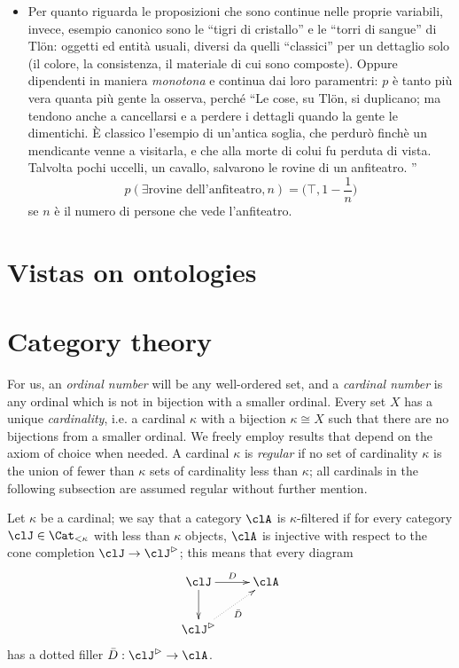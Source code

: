 \documentclass{amsart}
\begin{document}
\begin{itemize}
  \item Per quanto riguarda le proposizioni che sono continue nelle proprie variabili, invece, esempio canonico sono le ``tigri di cristallo'' e le ``torri di sangue'' di Tl\"{o}n: oggetti ed entità usuali, diversi da quelli ``classici'' per un dettaglio solo (il colore, la consistenza, il materiale di cui sono composte). Oppure dipendenti in maniera \emph{monotona} e continua dai loro paramentri: $p$ è tanto più vera quanta più gente la osserva, perché ``Le cose, su Tlön, si duplicano; ma tendono anche a cancellarsi e a  perdere i dettagli quando la gente le dimentichi. È classico l'esempio di  un'antica soglia, che perdurò finchè un mendicante venne a visitarla, e che alla  morte di colui fu perduta di vista. Talvolta pochi uccelli, un cavallo, salvarono le  rovine di un anfiteatro. ''
        \[\textstyle p(\exists\text{rovine dell'anfiteatro}, n) = \big(\top, 1-\frac{1}{n}\big)\]
        se $n$ è il numero di persone che vede l'anfiteatro.
\end{itemize}
\section{Vistas on ontologies}
\appendix
\section{Category theory}
For us, an \emph{ordinal number} will be any well\hyp{}ordered set, and a \emph{cardinal number} is any ordinal which is not in bijection with a smaller ordinal. Every set $X$ has a unique \emph{cardinality}, i.e. a cardinal $\kappa$ with a bijection $\kappa \cong X$ such that there are no bijections from a smaller ordinal. We freely employ results that depend on the axiom of choice when needed. A cardinal $\kappa$ is \emph{regular} if no set of cardinality $\kappa$ is the union of fewer than $\kappa$ sets of cardinality less than $\kappa$; all cardinals in the following subsection are assumed regular without further mention.

Let $\kappa$ be a cardinal; we say that a category $\clA$ is $\kappa$\hyp{}filtered if for every category $\clJ\in\Cat_{<\kappa}$ with less than $\kappa$ objects, $\clA$ is injective with respect to the cone completion $\clJ\to \clJ^\rhd$; this means that every diagram
\[
  \vcenter{\xymatrix{
      \clJ\ar[d]\ar[r]^D & \clA \\
      \clJ^\rhd\ar@{.>}[ur]_{\bar D}
    }}
\]
has a dotted filler $\bar D : \clJ^\rhd \to \clA$.
\end{document}
